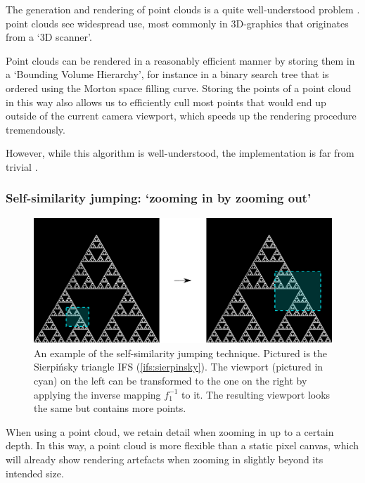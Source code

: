 \documentclass[11pt]{article}
\begin{document}
The generation and rendering of point clouds is a quite well-understood problem \cite{wimmer2006instant}. point clouds see widespread use,
most commonly in 3D-graphics that originates from a `3D scanner'.

Point clouds can be rendered in a reasonably efficient manner by storing them in a `Bounding Volume Hierarchy',
for instance in a binary search tree that is ordered using the Morton space filling curve. \cite{lauterbach2009construction}
Storing the points of a point cloud in this way also allows us to efficiently cull most points that would end up outside of the current camera viewport,
which speeds up the rendering procedure tremendously.

However, while this algorithm is well-understood, the implementation is far from trivial \cite{lauterbach2009construction}.

\subsubsection{Self-similarity jumping: `zooming in by zooming out'}
\label{sec:org3d23f27}
\label{subsection:self_similarity}

\begin{figure}

\includegraphics[width=\textwidth]{figures/sierpinsky_jump}
\caption{An example of the self-similarity jumping technique. Pictured is the Sierpi\'nsky triangle IFS (\autoref{ifs:sierpinsky}).
The viewport (pictured in cyan) on the left can be transformed to the one on the right by applying the inverse mapping $f_1^{-1}$ to it.
The resulting viewport looks the same but contains more points.}
\label{figure:sierpinsky_jump}
\end{figure}

When using a point cloud, we retain detail when zooming in up to a certain depth. In this way, a point cloud is more flexible than a 
static pixel canvas, which will already show rendering artefacts when zooming in slightly beyond its intended size.
\end{document}
